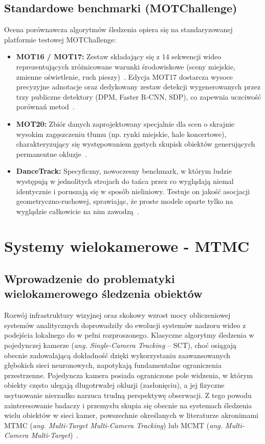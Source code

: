 \subsection{Standardowe benchmarki (MOTChallenge)}
Ocena porównawcza algorytmów śledzenia opiera się na standaryzowanej platformie testowej
MOTChallenge:
\begin{itemize}
  \item \textbf{MOT16 / MOT17:} Zestaw składający się z 14 sekwencji wideo reprezentujących zróżnicowane warunki środowiskowe (sceny miejskie, zmienne oświetlenie, ruch pieszy)~\cite{milan2016}. Edycja MOT17 dostarcza wysoce precyzyjne adnotacje oraz dedykowany zestaw detekcji wygenerowanych przez trzy publiczne detektory (DPM, Faster R-CNN, SDP), co zapewnia uczciwość porównań metod~\cite{milan2016, zhang2022}.

  \item \textbf{MOT20:} Zbiór danych zaprojektowany specjalnie dla scen o skrajnie wysokim zagęszczeniu tłumu (np. rynki miejskie, hale koncertowe), charakteryzujący się występowaniem gęstych skupisk obiektów generujących permanentne okluzje~\cite{dendorfer2020}.
  \item \textbf{DanceTrack:} Specyficzny, nowoczesny benchmark, w którym ludzie występują w jednolitych strojach do tańca przez co wyglądają niemal identycznie i poruszają się w sposób nieliniowy. Testuje on jakość asocjacji geometryczno-ruchowej, sprawiając, że proste modele oparte tylko na wyglądzie całkowicie na nim zawodzą~\cite{sun2022dancetrack}.
\end{itemize}

\section{Systemy wielokamerowe - MTMC}
\subsection{Wprowadzenie do problematyki wielokamerowego śledzenia obiektów}

Rozwój infrastruktury wizyjnej oraz skokowy wzrost mocy obliczeniowej systemów analitycznych
doprowadziły do ewolucji systemów nadzoru wideo z podejścia lokalnego do w pełni rozproszonego.
Klasyczne algorytmy śledzenia w pojedynczej kamerze (\textit{ang. Single-Camera Tracking} -- SCT),
choć osiągają obecnie zadowalającą dokładność dzięki wykorzystaniu zaawansowanych głębokich sieci
neuronowych, napotykają fundamentalne ograniczenia przestrzenne. Pojedyncza kamera posiada
ograniczone pole widzenia, w którym obiekty często ulegają długotrwałej okluzji (zasłonięciu), a
jej fizyczne usytuowanie nierzadko narzuca trudną perspektywę obserwacji. Z tego powodu
zainteresowanie badaczy i przemysłu skupia się obecnie na systemach śledzenia wielu obiektów w
sieci kamer, powszechnie określanych w literaturze akronimami MTMC (\textit{ang. Multi-Target
  Multi-Camera Tracking}) lub MCMT (\textit{ang. Multi-Camera Multi-Target})~\cite{ristani2016}.

